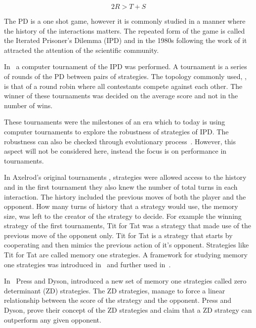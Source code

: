 \documentclass[10pt]{article}
\begin{document}
\begin{equation}\label{eq:pd_constrain_two}
    2R > T + S
\end{equation}

The PD is a one shot game, however it is commonly studied in a manner where the
history of the interactions matters. The repeated form of the game is called the
Iterated Prisoner's Dilemma (IPD) and in the 1980s following the work of
\cite{Axelrod1980a, Axelrod1980b} it attracted the attention of the scientific
community.

In~\cite{Axelrod1980a} a computer tournament of the IPD was performed. A
tournament is a series of rounds of the PD between pairs of strategies. The
topology commonly used, \cite{Axelrod1980a, Axelrod1980b}, is that of a round
robin where all contestants compete against each other. The winner of these
tournaments was decided on the average score and not in the number of wins.

These tournaments were the milestones of an era which to today is using
computer tournaments to explore the robustness of strategies of IPD.
The robustness can also be checked through evolutionary process~\cite{Nowak}.
However, this aspect will not be considered here, instead the focus is on
performance in tournaments.

In Axelrod's original tournaments \cite{Axelrod1980a, Axelrod1980b}, strategies
were allowed access to the history and in the first tournament they also knew
the number of total turns in each interaction. The history included the
previous moves of both the player and the opponent. How many turns of history
that a strategy would use, the memory size, was left to the creator of the
strategy to decide. For example the winning strategy of the first tournaments,
Tit for Tat was a strategy that made use of the previous move of the opponent
only. Tit for Tat is a strategy that starts by cooperating and then mimics the
previous action of it's opponent. Strategies like Tit for Tat are called memory
one strategies. A framework for studying memory one strategies was introduced
in~\cite{Nowak1989} and further used in~\cite{Nowak1993, Nowak1990}.

In~\cite{Press2012} Press and Dyson, introduced a new set of memory one
strategies called zero determinant (ZD) strategies. The ZD strategies,
manage to force a linear relationship between the score of the strategy
and the opponent. Press and Dyson, prove their concept of the ZD strategies
and claim that a ZD strategy can outperform any given opponent.
\end{document}

